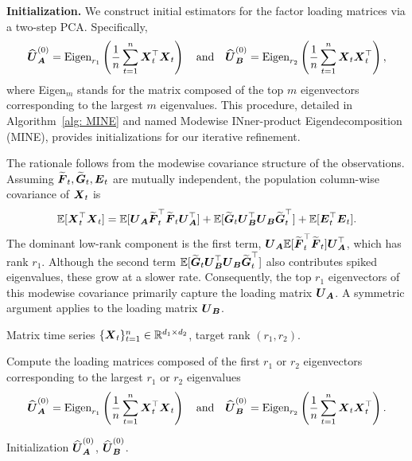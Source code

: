 \documentclass[11pt,letterpaper]{article}
\theoremstyle{definition}
\newcommand{\cano}[1]{\widetilde{\mathbf{#1}}}
\begin{document}
\noindent\textbf{Initialization.} We construct initial estimators for the factor loading matrices via a two-step PCA. Specifically, 
\begin{align*}
\widehat{\boldsymbol{U}}_{\boldsymbol{A}}^{(0)} = \text{Eigen}_{r_1} \left(\frac1n \sum_{t=1}^n \boldsymbol{X}_t^\top \boldsymbol{X}_t \right) \quad \text{and}\quad \widehat{\boldsymbol{U}}_{\boldsymbol{B}}^{(0)} = \text{Eigen}_{r_2} \left(\frac1n \sum_{t=1}^n \boldsymbol{X}_t \boldsymbol{X}_t^\top \right)   , 
\end{align*}
where Eigen$_m$ stands for the matrix composed of the top $m$ eigenvectors corresponding to the largest $m$ eigenvalues. This procedure, detailed in Algorithm~\ref{alg: MINE} and named Modewise INner-product Eigendecomposition (MINE), provides initializations for our iterative refinement.



The rationale follows from the modewise covariance structure of the observations. Assuming $\cano\bF_t,\cano\bG_t,\bE_t$ are mutually independent, the population column-wise covariance of $\boldsymbol{X}_t$ is
\begin{align*}
\mathbb{E}[\bX_t^\top \bX_t] = \mathbb{E}[\bU_{\bA}\cano\bF_t^\top \cano\bF_t\bU_{\bA}^\top] + \mathbb{E}[\cano\bG_t\bU_{\bB}^{\top} \bU_{\bB}\cano\bG_t^\top] + \mathbb{E}[\bE_t^\top\bE_t].    
\end{align*}
The dominant low-rank component is the first term, $\bU_{\bA}\EE[\cano\bF_t^\top \cano\bF_t]\bU_{\bA}^\top$, which has rank $r_1$. Although the second term $\EE[\cano\bG_t\bU_{\bB}^{\top} \bU_{\bB}\cano\bG_t^\top]$ also contributes spiked eigenvalues, these grow at a slower rate. Consequently, the top $r_1$ eigenvectors of this modewise covariance primarily capture the loading matrix $\boldsymbol{U}_{\boldsymbol{A}}$. A symmetric argument applies to the loading matrix $\boldsymbol{U}_{\boldsymbol{B}}$.



\begin{algorithm}[ht]
\caption{Modewise INner-product Eigendecomposition (MINE)}\label{alg: MINE}
\begin{algorithmic}[1]
\Require Matrix time series $\{\boldsymbol{X}_t\}_{t=1}^n \in \mathbb{R}^{d_1 \times d_2}$, target rank $(r_1, r_2)$. 

\State Compute the loading matrices composed of the first $r_1$ or $r_2$ eigenvectors corresponding to the largest $r_1$ or $r_2$ eigenvalues
\begin{align*}
\widehat{\boldsymbol{U}}_{\boldsymbol{A}}^{(0)} = \text{Eigen}_{r_1} \left( \frac{1}{n} \sum_{t=1}^n \boldsymbol{X}_t^\top \boldsymbol{X}_t \right) \quad \text{and} \quad \widehat{\boldsymbol{U}}_{\boldsymbol{B}}^{(0)} = \text{Eigen}_{r_2} \left( \frac{1}{n} \sum_{t=1}^n \boldsymbol{X}_t \boldsymbol{X}_t^\top \right)  .
\end{align*}

\Ensure Initialization $\widehat{\boldsymbol{U}}_{\boldsymbol{A}}^{(0)}$, $\widehat{\boldsymbol{U}}_{\boldsymbol{B}}^{(0)}$.
\end{algorithmic}
\end{algorithm}
\end{document}

